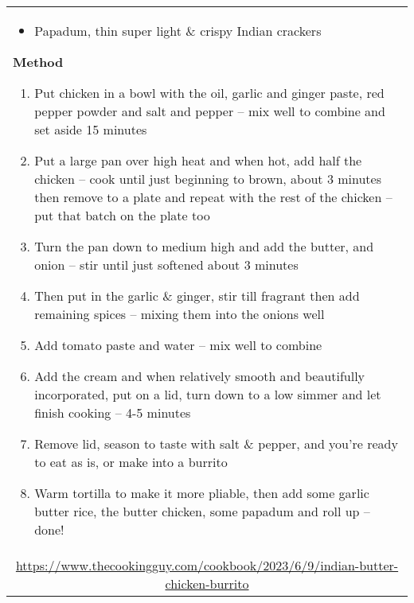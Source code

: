 \documentclass[web-recipes.tex]{subfiles}
\begin{document}
\begin{tabular}{l}
\begin{minipage}[t]{0.35\textwidth}
\begin{description}
        \begin{itemize}\raggedright\small\sffamily
          \item Papadum, thin super light \& crispy Indian crackers
        \end{itemize}
    \end{description}
  \end{minipage}
  \qquad
  \begin{minipage}[t]{0.55\textwidth}
    {\sffamily\bfseries Method}\vspace{0.5ex}
    \begin{enumerate}\raggedright\small\sffamily
      \item Put chicken in a bowl with the oil, garlic and ginger paste,
        red pepper powder and salt and pepper – mix well to combine and set
        aside 15 minutes
      \item Put a large pan over high heat and when hot, add half the
        chicken – cook until just beginning to brown, about 3 minutes then
        remove to a plate and repeat with the rest of the chicken – put
        that batch on the plate too
      \item Turn the pan down to medium high and add the butter, and
        onion – stir until just softened about 3 minutes
      \item Then put in the garlic \& ginger, stir till fragrant then add
        remaining spices – mixing them into the onions well
      \item Add tomato paste and water – mix well to combine
      \item Add the cream and when relatively smooth and beautifully
        incorporated, put on a lid, turn down to a low simmer and let
        finish cooking – 4-5 minutes
      \item Remove lid, season to taste with salt \& pepper, and you’re
        ready to eat as is, or make into a burrito
      \item Warm tortilla to make it more pliable, then add some garlic
        butter rice, the butter chicken, some papadum and roll up – done!
    \end{enumerate}
  \end{minipage} \vspace{3ex}\\
  \multicolumn{1}{c}{\small\ttfamily
  \url{https://www.thecookingguy.com/cookbook/2023/6/9/indian-butter-chicken-burrito}} \\
\end{tabular}
\end{document}
